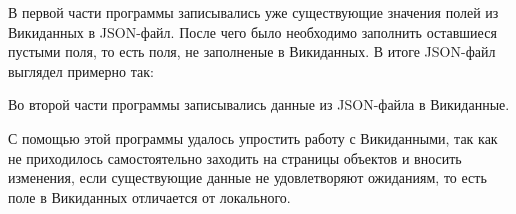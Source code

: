 
В первой части программы записывались уже существующие значения полей из Викиданных в JSON-файл. После чего было необходимо заполнить оставшиеся пустыми поля, то есть поля, не заполненые в Викиданных. В итоге JSON-файл выглядел примерно так:


Во второй части программы записывались данные из JSON-файла в Викиданные.

С помощью этой программы удалось упростить работу с Викиданными, так как не приходилось самостоятельно заходить на страницы объектов и вносить изменения, если существующие данные не удовлетворяют ожиданиям, то есть поле в Викиданных отличается от локального.

